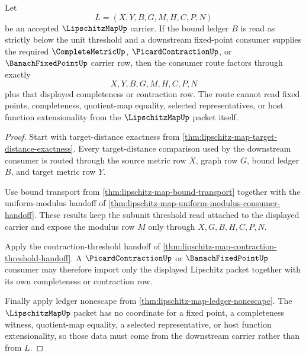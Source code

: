 \begin{theorem}
\label{thm:lipschitz-map-contraction-threshold-factorization}
Let
$$
L=(X,Y,B,G,M,H,C,P,N)
$$
be an accepted $\LipschitzMapUp$ carrier. If the bound ledger $B$ is read as
strictly below the unit threshold and a downstream fixed-point consumer supplies
the required $\CompleteMetricUp$, $\PicardContractionUp$, or
$\BanachFixedPointUp$ carrier row, then the consumer route factors through
exactly
$$
X,Y,B,G,M,H,C,P,N
$$
plus that displayed completeness or contraction row. The route cannot read
fixed points, completeness, quotient-map equality, selected representatives, or
host function extensionality from the $\LipschitzMapUp$ packet itself.
\end{theorem}
\begin{proof}
Start with target-distance exactness from
\autoref{thm:lipschitz-map-target-distance-exactness}. Every target-distance
comparison used by the downstream consumer is routed through the source metric
row $X$, graph row $G$, bound ledger $B$, and target metric row $Y$.

Use bound transport from \autoref{thm:lipschitz-map-bound-transport} together
with the uniform-modulus handoff of
\autoref{thm:lipschitz-map-uniform-modulus-consumer-handoff}. These results
keep the subunit threshold read attached to the displayed carrier and expose
the modulus row $M$ only through $X,G,B,H,C,P,N$.

Apply the contraction-threshold handoff of
\autoref{thm:lipschitz-map-contraction-threshold-handoff}. A
$\PicardContractionUp$ or $\BanachFixedPointUp$ consumer may therefore import
only the displayed Lipschitz packet together with its own completeness or
contraction row.

Finally apply ledger nonescape from
\autoref{thm:lipschitz-map-ledger-nonescape}. The $\LipschitzMapUp$ packet has
no coordinate for a fixed point, a completeness witness, quotient-map equality,
a selected representative, or host function extensionality, so those data must
come from the downstream carrier rather than from $L$.
\end{proof}

